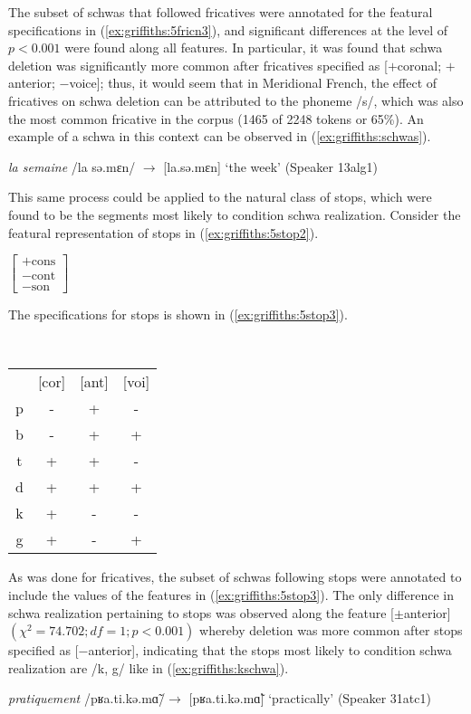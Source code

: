 \documentclass[output=paper,colorlinks,citecolor=brown,
]{langscibook}
\begin{document}
The subset of schwas that followed fricatives were annotated for the featural specifications in (\ref{ex:griffiths:5fricn3}),  and significant differences at the level of $p<0.001$ were found along all features. In particular, it was found that schwa deletion was significantly more common after fricatives specified as [$+$coronal; $+$anterior; $-$voice]; thus, it would seem that in Meridional French, the effect of fricatives on schwa deletion can be attributed to the phoneme /s/, which was also the most common fricative in the corpus (1465 of 2248 tokens or 65\%). An example of a schwa in this context can be observed in (\ref{ex:griffiths:schwas}).
\begin{exe}
    \ex\label{ex:griffiths:schwas} \textit{la semaine} /la sə.mɛn/ $\rightarrow$ [la.sə.mɛn] `the week' (Speaker 13alg1)
\end{exe}

This same  process could be applied to the natural class of stops, which were found to be the segments most likely to condition schwa realization. Consider the featural representation of stops in (\ref{ex:griffiths:5stop2}).
\begin{exe}
\ex\label{ex:griffiths:5stop2} $\begin{bmatrix}
+\text{cons}\\
-\text{cont}\\
-\text{son}
\end{bmatrix}$
\end{exe}
The specifications for stops is shown in (\ref{ex:griffiths:5stop3}).
\begin{exe}
\ex\label{ex:griffiths:5stop3} \ \\ \begin{tabular}{cccc}
 & [cor] & [ant] & [voi] \\ \cline{2-4} 
\multicolumn{1}{c|}{p} & - & + & - \\
\multicolumn{1}{c|}{b} & - & + & + \\
\multicolumn{1}{c|}{t} & + & + & - \\
\multicolumn{1}{c|}{d} & + & + & + \\
\multicolumn{1}{c|}{k} & + & - & - \\
\multicolumn{1}{c|}{g} & + & - & +
\end{tabular}
\end{exe}
As was done for fricatives, the subset of schwas following stops were annotated to include the values of the features in (\ref{ex:griffiths:5stop3}). The only difference in schwa realization pertaining to stops was observed along the feature [$\pm$anterior] $(\chi^2=74.702; df =1; p<0.001)$ whereby deletion was more common after stops specified as [$-$anterior], indicating that the stops most likely to condition schwa realization are /k, g/ like in (\ref{ex:griffiths:kschwa}).
\begin{exe}
\ex\label{ex:griffiths:kschwa} \textit{pratiquement} /pʁa.ti.kə.mɑ̃/$\rightarrow$ [pʁa.ti.kə.mɑ̃] `practically' (Speaker 31atc1)
\end{exe}
\end{document}
